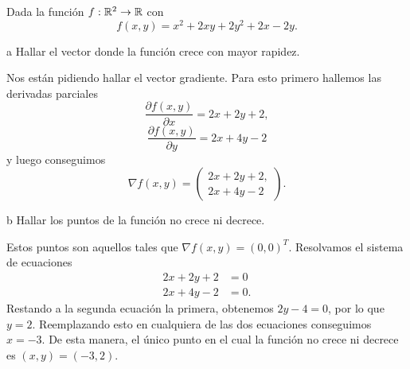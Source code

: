 \begin{statement}{6}
  Dada la funci\'on $f: \mathbb{R}^2 \to \mathbb{R}$ con
  \[
    f(x, y) = x^2 + 2xy + 2y^2 + 2x - 2y.  
  \]
\end{statement}

\begin{statement}{a}
  Hallar el vector donde la funci\'on crece con mayor rapidez.
\end{statement}

\begin{solution}
  Nos est\'an pidiendo hallar el vector gradiente.
  Para esto primero hallemos las derivadas parciales
  \[
    \frac{\partial f(x, y)}{\partial x} = 2x + 2y + 2,
  \]
  \[
    \frac{\partial f(x, y)}{\partial y} = 2x + 4y - 2
  \]
  y luego conseguimos
  \[
    \nabla f(x, y) = \begin{pmatrix}
      2x + 2y + 2, \\
      2x + 4y - 2
    \end{pmatrix}.
  \]
\end{solution}

\begin{statement}{b}
  Hallar los puntos de la funci\'on no crece ni decrece.
\end{statement}

\begin{solution}
  Estos puntos son aquellos tales que $\nabla f(x, y) = (0, 0)^T$.
  Resolvamos el sistema de ecuaciones
  \begin{align*}
    2x + 2y + 2 &= 0\\
    2x + 4y - 2 &= 0.
  \end{align*}
  Restando a la segunda ecuaci\'on la primera, obtenemos $2y - 4 = 0$,
  por lo que $y = 2$. Reemplazando esto en cualquiera de las dos ecuaciones
  conseguimos $x = -3$.
  De esta manera, el \'unico punto en el cual la funci\'on no crece ni decrece
  es $(x, y) = (-3, 2)$.
\end{solution}